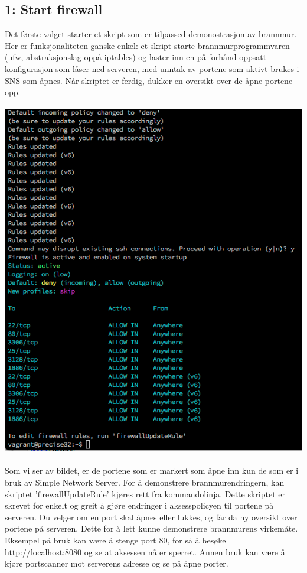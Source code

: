 \documentclass{article}
\begin{document}
\subsection{1: Start firewall}
Det første valget starter et skript som er tilpassed demonostrasjon av brannmur. \\ Her er funksjonaliteten ganske enkel: et skript starte brannmurprogrammvaren (ufw, abstraksjonslag oppå iptables) og laster inn en på forhånd oppsatt konfigurasjon som låser ned serveren, med unntak av portene som aktivt brukes i SNS som åpnes. Når skriptet er ferdig, dukker en oversikt over de åpne portene opp. 
\\ \\
\includegraphics[scale = 0.7]{pictures/firewall.png}
\\ \\ 
Som vi ser av bildet, er de portene som er markert som åpne inn kun de som er i bruk av Simple Network Server. 
For å demonstrere brannmurendringern, kan skriptet 'firewallUpdateRule' kjøres rett fra kommandolinja. Dette skriptet er skrevet for enkelt og greit å gjøre endringer i aksesspolicyen til portene på serveren. Du velger om en port skal åpnes eller lukkes, og får da ny oversikt over portene på serveren. Dette for å lett kunne demonstrere brannmurens virkemåte. Eksempel på bruk kan være å stenge port 80, for så å besøke \url{http://localhost:8080} og se at aksessen nå er sperret. Annen bruk kan være å kjøre portscanner mot serverens adresse og se på åpne porter. 
\end{document}
